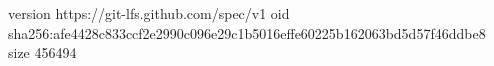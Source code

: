 version https://git-lfs.github.com/spec/v1
oid sha256:afe4428c833ccf2e2990c096e29c1b5016effe60225b162063bd5d57f46ddbe8
size 456494
